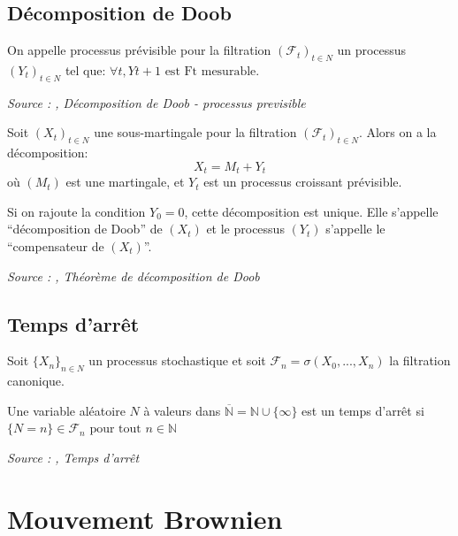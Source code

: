 \subsection{Décomposition de Doob}

\begin{definition}\label{def:processus_previsible}
On appelle processus prévisible pour la filtration $(\mathcal{F}_t)_{t \in N}$ un processus $(Y_t)_{t \in N}$ tel que: $\forall t, Yt+1 \text{ est Ft mesurable}$.

\noindent\textit{Source : \cite{processus_stochastique},  Décomposition de Doob - processus previsible}
\end{definition}

\begin{definition}\label{def:theoreme_decomposition_doob}
Soit $(X_t)_{t \in N}$ une sous-martingale pour la filtration $(\mathcal{F}_t)_{t \in N}$.
Alors on a la décomposition:
$$X_t = M_t + Y_t$$
où $(M_t)$ est une martingale, et $Y_t$ est un processus croissant prévisible.

Si on rajoute la condition $Y_0 = 0$, cette décomposition est unique. Elle s’appelle “décomposition de Doob” de $(X_t)$ et le processus $(Y_t)$ s’appelle le “compensateur de $(X_t)$”.

\noindent\textit{Source : \cite{processus_stochastique}, Théorème de décomposition de Doob}
\end{definition}


\subsection{Temps d'arrêt}

\begin{definition}\label{def:temps_arret}
Soit $\{X_n\}_{n \in N}$ un processus stochastique et soit $\mathcal{F}_n = \sigma(X_0, ..., X_n)$ la filtration canonique.

Une variable aléatoire $N$ à valeurs dans $\overline{\mathbb{N}} = \mathbb{N} \cup \{\infty\}$ est un temps d'arrêt si $\{N = n\} \in \mathcal{F}_n \text{ pour tout } n \in \mathbb{N}$

\noindent\textit{Source : \cite{martingale_calcul_stochastique},  Temps d’arrêt}
\end{definition}



\section{Mouvement Brownien}


